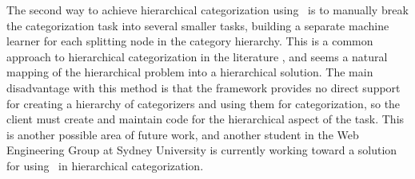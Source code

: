 The second way to achieve hierarchical categorization using \aicat\ is
to manually break the categorization task into several smaller tasks,
building a separate machine learner for each splitting node in the
category hierarchy.  This is a common approach to hierarchical
categorization in the literature
\cite{dumais:00,koller:97,chakrabarti:98}, and seems a natural mapping
of the hierarchical problem into a hierarchical solution.  The main
disadvantage with this method is that the framework provides no direct
support for creating a hierarchy of categorizers and using them for
categorization, so the client must create and maintain code for the
hierarchical aspect of the task.  This is another possible area of
future work, and another student in the Web Engineering Group at
Sydney University is currently working toward a solution for using
\aicat\ in hierarchical categorization.
